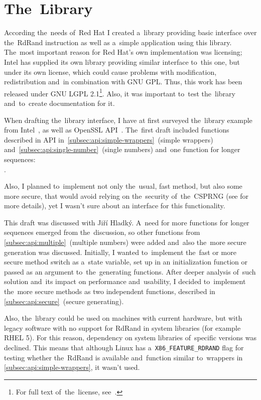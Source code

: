 \chapter{The~Library}\label{chap:library}
\par{
According the~needs of~Red Hat I created a~library providing basic interface over the~RdRand instruction as well as a~simple application using this library. The~most important reason for Red Hat's own implementation was licensing; Intel has supplied its own library providing similar interface to~this one, but under its own license, which could cause problems with modification, redistribution and~in combination with GNU GPL. Thus, this work has been released under GNU LGPL 2.1\footnote{For full text of~the~license, see~\cite{GNULGPL}.}. Also, it was important to~test the~library and~to~create documentation for it.
}

\par{
When drafting the~library interface, I have at first surveyed the~library example from Intel~\cite{IntelDRNGGuide}, as well as OpenSSL API~\cite{OpenSSLAPI}. The~first draft included functions described in API in~\ref{subsec:api:simple-wrappers}~(simple wrappers) and~\ref{subsec:api:single-number}~(single numbers) and~one function for longer sequences: \\. 
}

\par{
Also, I planned to~implement not only the~usual, fast method, but also some more secure, that would avoid relying on the~security of~the~CSPRNG (see  for more details), yet I wasn't sure about an interface for this functionality.
}

\par{
This draft was discussed with Jiří Hladký. A~need for more functions for longer sequences emerged from the~discussion, so other functions from \ref{subsec:api:multiple}~(multiple numbers) were added and~also the~more secure generation was discussed. Initially, I wanted to~implement the~fast or more secure method switch as a~state variable, set up in an initialization function or passed as an argument to~the~generating functions. After deeper analysis of~such solution and~its impact on performance and~usability, I decided to~implement the~more secure methods as two independent functions, described in \ref{subsec:api:secure}~(secure generating).  
}

\par{
Also, the~library could be used on machines with current hardware, but with legacy software with no support for RdRand in system libraries (for example RHEL 5). For this reason, dependency on system libraries of~specific versions was declined. This means that although Linux has a~{\tt X86\_FEATURE\_RDRAND} flag for testing whether the~RdRand is available and~function similar to~wrappers in \ref{subsec:api:simple-wrappers}, it wasn't used.
}

